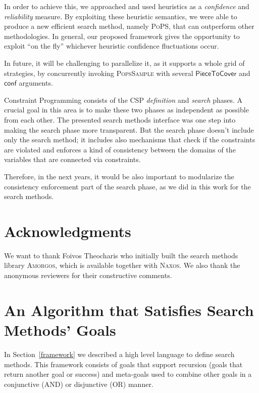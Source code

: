 \documentclass{ws-ijait}
\begin{document}
In order to achieve this, we approached and used heuristics
as a \emph{confidence} and \emph{reliability} measure. By
exploiting these heuristic semantics, we were able to
produce a new efficient search method, namely \textsc{PoPS},
that can outperform other methodologies. In general, our
proposed framework gives the opportunity to exploit ``on the
fly'' whichever heuristic confidence fluctuations occur.

In future, it will be challenging to parallelize it, as it
supports a whole grid of strategies, by concurrently
invoking \textsc{PopsSample} with several
$\mathsf{PieceToCover}$ and $\mathsf{conf}$ arguments.

Constraint Programming consists of the CSP \emph{definition}
and \emph{search} phases. A crucial goal in this area is to
make these two phases as independent as possible from each
other.\cite{Freuder2014} The presented search methods
interface was one step into making the search phase more
transparent. But the search phase doesn't include only the
search method; it includes also mechanisms that check if the
constraints are violated and enforces a kind of consistency
between the domains of the variables that are connected via
constraints.\cite{Chen2013}

Therefore, in the next years, it would be also important to
modularize the consistency enforcement part of the search
phase, as we did in this work for the search methods.


\section*{Acknowledgments}

We want to thank Foivos Theocharis who initially built the
search methods library \textsc{Amorgos}, which is available
together with \textsc{Naxos}.\cite{Naxos} We also thank the
anonymous reviewers for their constructive comments.





\appendix

\section{An Algorithm that Satisfies Search Methods' Goals}

In Section~\ref{framework} we described a high level
language to define search methods. This framework consists
of goals that support recursion (goals that return another
goal or success) and meta-goals used to combine other goals
in a conjunctive (\textsf{AND}) or disjunctive (\textsf{OR})
manner.
\end{document}
